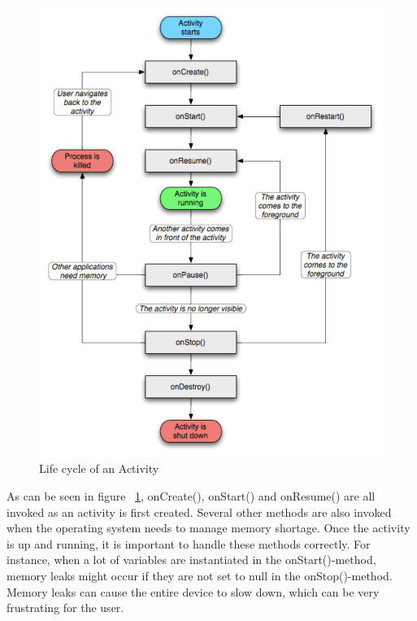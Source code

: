 \begin{figure}[here]
\begin{center}
\includegraphics[scale=0.5]{pics/chapters/chapter2/activity_lifecycle2}
\end{center}
\caption{Life cycle of an Activity}
\label{fig:androidActivityLifeCycle}
\end{figure}

As can be seen in figure ~\ref{fig:androidActivityLifeCycle}, onCreate(), onStart() and onResume() are all invoked as an activity is first created. Several other methods are also invoked when the operating system needs to manage memory shortage. Once the activity is up and running, it is important to handle these methods correctly. For instance, when a lot of variables are instantiated in the onStart()-method, memory leaks might occur if they are not set to null in the onStop()-method. Memory leaks can cause the entire device to slow down, which can be very frustrating for the user.
 

